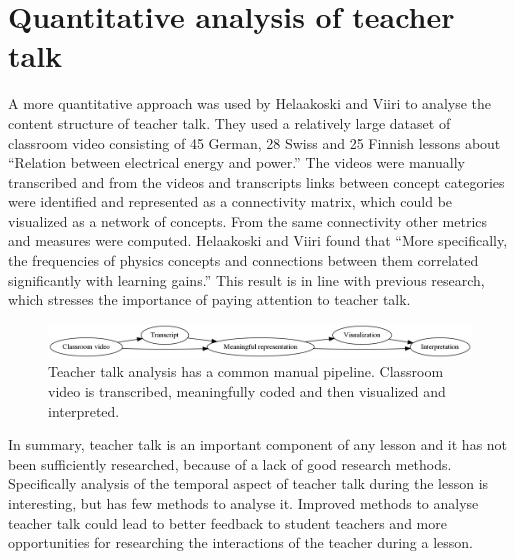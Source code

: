 \documentclass[utf8,english]{gradu3}
\begin{document}
\section{Quantitative analysis of teacher talk}
A more quantitative approach was used by Helaakoski and Viiri \parencite{helaakoskiContentContentStructure2014} to analyse the content structure of teacher talk. They used a relatively large dataset of classroom video consisting of 45 German, 28 Swiss and 25 Finnish lessons about \enquote{Relation  between  electrical  energy  and  power.} The videos were manually transcribed and from the videos and transcripts links between concept categories were identified and represented as a connectivity matrix, which could be visualized as a network of concepts. From the same connectivity other metrics and measures were computed. Helaakoski and Viiri \parencite*{helaakoskiContentContentStructure2014} found that \enquote{More  specifically,  the  frequencies  of  physics  concepts  and  connections  between  them  correlated  significantly  with  learning  gains.} This result is in line with previous research, which stresses the importance of paying attention to teacher talk. \parencite{viiriTeacherTalkPatterns2006,scottTeachingScienceMeaningful2007,scottPedagogicalLinkMaking2011}

\begin{figure}
  \includegraphics[width=\linewidth]{../figures/teacher_talk_manual_pipeline.png}
  \caption{Teacher talk analysis has a common manual pipeline. Classroom video is transcribed, meaningfully coded and then visualized and interpreted.}
  \label{fig:manualpipeline}
\end{figure}

In summary, teacher talk is an important component of any lesson and it has not been sufficiently researched, because of a lack of good research methods. Specifically analysis of the temporal aspect of teacher talk during the lesson is interesting, but has few methods to analyse it. Improved methods to analyse teacher talk could lead to better feedback to student teachers and more opportunities for researching the interactions of the teacher during a lesson.

\end{document}
